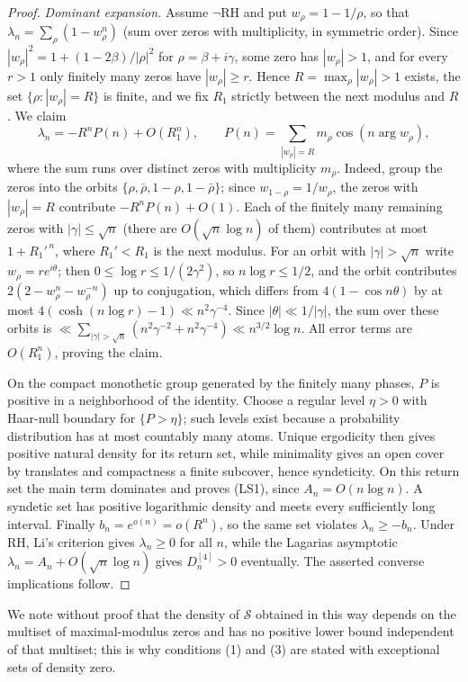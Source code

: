 \documentclass[11pt]{amsart}
\theoremstyle{definition}
\theoremstyle{remark}
\theoremstyle{definition}
\newcommand{\RH}{\mathrm{RH}}
\begin{document}
\begin{proof}
\emph{Dominant expansion.}  Assume $\neg\RH$ and put
$w_\rho=1-1/\rho$, so that $\lambda_n=\sum_\rho(1-w_\rho^n)$ (sum over
zeros with multiplicity, in symmetric order).  Since
$|w_\rho|^2=1+(1-2\beta)/|\rho|^2$ for $\rho=\beta+i\gamma$, some zero has
$|w_\rho|>1$, and for every $r>1$ only finitely many zeros have
$|w_\rho|\ge r$.  Hence $R=\max_\rho|w_\rho|>1$ exists, the set
$\{\rho:|w_\rho|=R\}$ is finite, and we fix $R_1$ strictly between the next
modulus and $R$.  We claim
\[
 \lambda_n=-R^nP(n)+O(R_1^n),\qquad
 P(n)=\sum_{|w_\rho|=R}m_\rho\cos(n\arg w_\rho),
\]
where the sum runs over distinct zeros with multiplicity $m_\rho$.  Indeed,
group the zeros into the orbits $\{\rho,\bar\rho,1-\rho,1-\bar\rho\}$;
since $w_{1-\rho}=1/w_\rho$, the zeros with $|w_\rho|=R$ contribute
$-R^nP(n)+O(1)$.  Each of the finitely many remaining zeros with
$|\gamma|\le\sqrt n$ (there are $O(\sqrt n\log n)$ of them) contributes at
most $1+R_1'^{\,n}$, where $R_1'<R_1$ is the next modulus.  For an orbit
with $|\gamma|>\sqrt n$ write $w_\rho=re^{i\theta}$; then
$0\le\log r\le 1/(2\gamma^2)$, so $n\log r\le1/2$, and the orbit
contributes $2(2-w_\rho^n-w_\rho^{-n})$ up to conjugation, which differs
from $4(1-\cos n\theta)$ by at most $4(\cosh(n\log r)-1)\ll n^2\gamma^{-4}$.
Since $|\theta|\ll1/|\gamma|$, the sum over these orbits is
$\ll\sum_{|\gamma|>\sqrt n}(n^2\gamma^{-2}+n^2\gamma^{-4})\ll n^{3/2}\log n$.
All error terms are $O(R_1^n)$, proving the claim.

On the compact monothetic group generated by the finitely many phases,
$P$ is positive in a neighborhood of the identity.  Choose a regular
level $\eta>0$ with Haar-null boundary for $\{P>\eta\}$; such levels exist
because a probability distribution has at most countably many atoms.
Unique ergodicity then gives positive natural density for its return set,
while minimality gives an open cover by translates and compactness a finite
subcover, hence syndeticity.  On this return set the main term dominates and proves (LS1),
since $A_n=O(n\log n)$.  A syndetic set has positive logarithmic density
and meets every sufficiently long interval.  Finally
$b_n=e^{o(n)}=o(R^n)$, so the same set violates
$\lambda_n\ge-b_n$.  Under RH, Li's criterion gives $\lambda_n\ge0$ for
all $n$, while the Lagarias asymptotic
$\lambda_n=A_n+O(\sqrt n\log n)$ gives $D_n^{[4]}>0$ eventually.  The
asserted converse implications follow.
\end{proof}

We note without proof that the density of $\mathcal S$ obtained in this
way depends on the multiset of maximal-modulus zeros and has no positive
lower bound independent of that multiset; this is why conditions (1) and
(3) are stated with exceptional sets of density zero.
\end{document}
